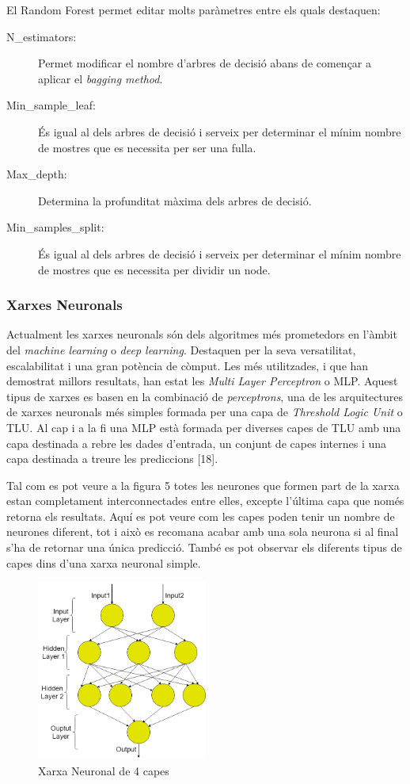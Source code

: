 \documentclass[10pt,a4paper,twocolumn,twoside]{article}
\begin{document}
El Random Forest permet editar molts paràmetres entre els quals destaquen:
\begin{description}
\item[N\_estimators:] Permet modificar el nombre d'arbres de decisió abans de començar a aplicar el \textit{bagging method}.
\item[Min\_sample\_leaf:] És igual al dels arbres de decisió i serveix per determinar el mínim nombre de mostres que es necessita per ser una fulla.
\item[Max\_depth:] Determina la profunditat màxima dels arbres de decisió.
\item[Min\_samples\_split:] És igual al dels arbres de decisió i serveix per determinar el mínim nombre de mostres que es necessita per dividir un node.
\end{description}

\subsubsection{Xarxes Neuronals}
Actualment les xarxes neuronals són dels algoritmes més prometedors en l'àmbit del \textit{machine learning} o \textit{deep learning}. Destaquen per la seva versatilitat, escalabilitat i una gran potència de còmput. Les més utilitzades, i que han demostrat millors resultats, han estat les \textit{Multi Layer Perceptron} o MLP. Aquest tipus de xarxes es basen en la combinació de \textit{perceptrons}, una de les arquitectures de xarxes neuronals més simples formada per una capa de \textit{Threshold Logic Unit} o TLU. Al cap i a la fi una MLP està formada per diverses capes de TLU amb una capa destinada a rebre les dades d'entrada, un conjunt de capes internes i una capa destinada a treure les prediccions [18].

Tal com es pot veure a la figura 5 totes les neurones que formen part de la xarxa estan completament interconnectades entre elles, excepte l'última capa que només retorna els resultats. Aquí es pot veure com les capes poden tenir un nombre de neurones diferent, tot i això es recomana acabar amb una sola neurona si al final s'ha de retornar una única predicció. També es pot observar els diferents tipus de capes dins d'una xarxa neuronal simple.
 \begin{figure}[!h]
\centering
	\includegraphics[width=0.5\textwidth]{../img/XarxaNeur}
	\caption{Xarxa Neuronal de 4 capes}
	\label{fig-XarxaNeur}
\end{figure}
\end{document}
